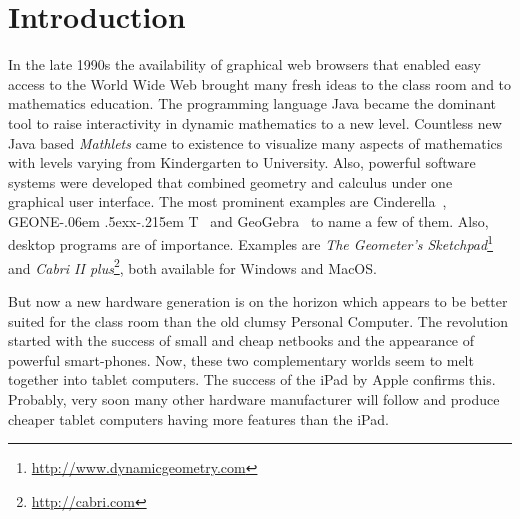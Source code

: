 \documentclass[12pt,a4paper]{article}%
\def\GEONExT{GEONE\kern-.06em \lower.5ex\hbox{x}\kern-.215em T}
\begin{document}
\thispagestyle{fancy}                                     %
%
%



\section{Introduction}
In the late 1990s the availability of graphical web browsers that enabled easy access to the 
World Wide Web 
brought many fresh ideas to the class room and to mathematics education. 
The programming language Java became the dominant tool to raise interactivity in 
dynamic mathematics to a new level. Countless new Java based \emph{Mathlets} came to existence 
to visualize many aspects of mathematics with levels varying from Kindergarten to University. 
Also, powerful software systems were developed that combined geometry and calculus 
under one graphical user interface. The most prominent examples are 
Cinderella~\cite{kortenkamp1999}, \GEONExT~\cite{ehmann2003} and GeoGebra~\cite{hohenwarter2005} 
to name a few of them.
Also, desktop programs are of importance. Examples are
{\sl The Geometer's Sketchpad}\footnote{\href{http://www.dynamicgeometry.com}{http://www.dynamicgeometry.com}} 
and {\sl Cabri II plus}\footnote{\href{http://cabri.com}{http://cabri.com}}, 
both available for Windows and MacOS.

But now a new hardware generation is on the horizon which appears to be better suited 
for the class room than the old clumsy Personal Computer. 
The revolution started with the success of small and cheap netbooks and the appearance of 
powerful smart-phones. 
Now, these two complementary worlds seem to melt together into tablet computers. 
The success of the iPad by Apple confirms this. 
Probably, very soon many other hardware manufacturer will follow and produce 
cheaper tablet computers having more features than the iPad.
\end{document}
